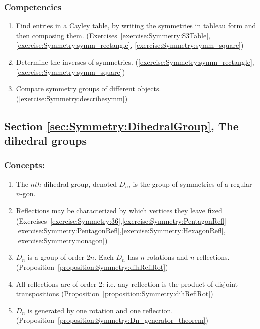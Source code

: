 \subsubsection*{Competencies}
\begin{enumerate}
\item
Find entries in a Cayley table, by writing the symmetries in tableau form and then composing them. (Exercises~\ref{exercise:Symmetry:S3Table},\ref{exercise:Symmetry:symm_rectangle}, \ref{exercise:Symmetry:symm_square})
\item
Determine the inverses of symmetries. (\ref{exercise:Symmetry:symm_rectangle},  \ref{exercise:Symmetry:symm_square})
\item
Compare symmetry groups of different objects. (\ref{exercise:Symmetry:describesymm})
\end{enumerate}


\subsection*{Section \ref{sec:Symmetry:DihedralGroup}, The dihedral groups}
\subsubsection*{Concepts:}
\begin{enumerate}
\item 
The $nth$ dihedral group, denoted $D_n$, is the group of symmetries of a regular $n$-gon.
\item
Reflections may be characterized by which vertices they leave fixed (Exercises~\ref{exercise:Symmetry:36},\ref{exercise:Symmetry:PentagonRefl}\ref{exercise:Symmetry:PentagonRefl},\ref{exercise:Symmetry:HexagonRefl},\ref{exercise:Symmetry:nonagon}) 
\item
$D_n$ is a group of order $2n$.  Each $D_n$ has $n$ rotations and $n$ reflections. (Proposition~\ref{proposition:Symmetry:dihReflRot})
\item
All reflections are of order 2: i.e. any reflection is the product of disjoint transpositions (Proposition~\ref{proposition:Symmetry:dihReflRot})

\item
$D_n$ is generated by one rotation and one reflection.  (Proposition~\ref{proposition:Symmetry:Dn_generator_theorem})
\end{enumerate}

